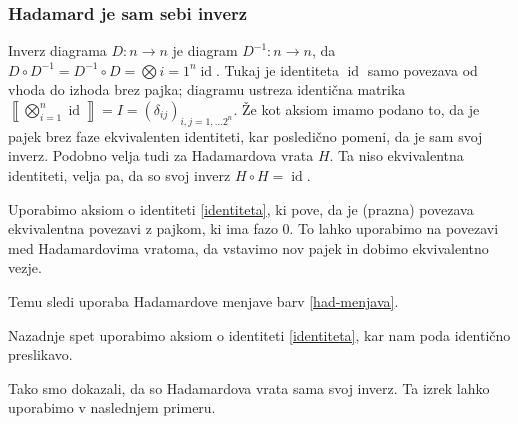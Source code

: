 \documentclass[mat1]{fmfdelo}
\newcommand{\interpret}[1]{\left\llbracket #1 \right\rrbracket}
\DeclareMathOperator*{\id}{id}
\begin{document}
\subsubsection{Hadamard je sam sebi inverz}
Inverz diagrama \(D:n\to n\) je diagram \(D^{-1}:n\to n\), da \(D\circ D^{-1} = D^{-1}\circ D = \bigotimes{i=1}^n\id\). Tukaj je identiteta \(\id\) samo povezava od vhoda do izhoda brez pajka; diagramu ustreza identična matrika \(\interpret{\bigotimes_{i=1}^n\id} = I = (\delta_{ij})_{i,j=1,\ldots 2^n}\). Že kot aksiom imamo podano to, da je pajek brez faze ekvivalenten identiteti, kar posledično pomeni, da je sam svoj inverz. Podobno velja tudi za Hadamardova vrata \(H\). Ta niso ekvivalentna identiteti, velja pa, da so svoj inverz \(H\circ H = \id\).
\begin{center}
\end{center}
Uporabimo aksiom o identiteti \ref{identiteta}, ki pove, da je (prazna) povezava ekvivalentna povezavi z pajkom, ki ima fazo 0. To lahko uporabimo na povezavi med Hadamardovima vratoma, da vstavimo nov pajek in dobimo ekvivalentno vezje.
\begin{center}
\end{center}
Temu sledi uporaba Hadamardove menjave barv \ref{had-menjava}.
\begin{center}
\end{center}
Nazadnje spet uporabimo aksiom o identiteti \ref{identiteta}, kar nam poda identično preslikavo.
\begin{center}
\end{center}
Tako smo dokazali, da so Hadamardova vrata sama svoj inverz. Ta izrek lahko uporabimo v naslednjem primeru.
\end{document}
